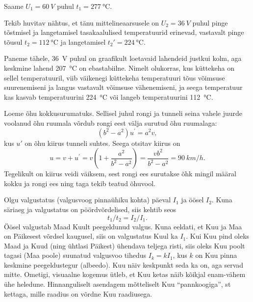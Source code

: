 \documentclass[10pt, twoside]{article}
\begin{document}
{Saame $U_1 = \SI{60}{V}$ puhul $t_1 = \SI{277}{\degreeCelsius}$.

Tekib huvitav nähtus, et tänu mittelineaarsusele on $U_2 = \SI{36}{V}$ puhul pinge tõstmisel ja langetamisel tasakaalulised temperatuurid erinevad, vastavalt pinge tõusul $t_2 = \SI{112}{\degreeCelsius}$ ja langetamisel $t_2' = \SI{224}{\degreeCelsius}$.

Paneme tähele, \SI{36}{V} puhul on graafikult loetavaid lahendeid justkui kolm, aga keskmine lahend \SI{207}{\degreeCelsius} on ebastabiilne. Nimelt olukorras, kus küttekeha on sellel temperatuuril, viib väikenegi küttekeha temperatuuri tõus võimsuse suurenemiseni ja langus vastavalt võimsuse vähenemiseni, ja seega temperatuur kas kasvab temperatuurini \SI{224}{\degreeCelsius} või langeb temperatuurini \SI{112}{\degreeCelsius}.
\probend
\newpage
\bigskip


\solu
Loeme õhu kokkusurumatuks. Sellisel juhul rongi ja tunneli seina vahele juurde
voolanud õhu ruumala võrdub rongi eest välja surutud õhu ruumalaga:
\[
\left(b^{2}-a^{2}\right) u^{\prime}=a^{2} v,
\]
kus $u'$ on õhu kiirus tunneli suhtes. Seega otsitav kiirus on
\[
u=v+u^{\prime}=v\left(1+\frac{a^{2}}{b^{2}-a^{2}}\right)=\frac{v b^{2}}{b^{2}-a^{2}}=\SI{90}{km/h}.
\]
Tegelikult on kiirus veidi väiksem, sest rongi ees surutakse õhk mingil määral kokku ja rongi ees ning taga tekib teatud õhuvool.
\probend
\bigskip


\solu
Olgu valgustatus (valgusvoog pinnaühiku kohta) päeval $I_1$ ja öösel $I_2$. Kuna säriaeg ja valgustatus on pöördvõrdelised, siis kehtib seos
\[
t_1/t_2 = I_2/I_1.
\]
Öösel valgustab Maad Kuult peegeldunud valgus. Kuna eeldati, et Kuu ja Maa on Päikesest võrdsel kaugusel, siis on valgustatus Kuul ka $I_1$. Kui Kuu pind oleks Maad ja Kuud (ning ühtlasi Päikest) ühendava teljega risti, siis oleks Kuu poolt tagasi (Maa poole) suunatud valgusvoo tihedus $I_k = kI_1$, kus $k$ on Kuu pinna keskmine peegeldustegur (albeedo). Kuu näiv keskpunkt seda ka on, aga servad mitte. Ometigi, visuaalne kogemus ütleb, et Kuu ketas näib kõikjal enam-vähem ühe heledune. Hinnanguliselt asendagem mõtteliselt Kuu \enquote{pannkoogiga}, st kettaga, mille raadius on võrdne Kuu raadiusega.

}
\end{document}
